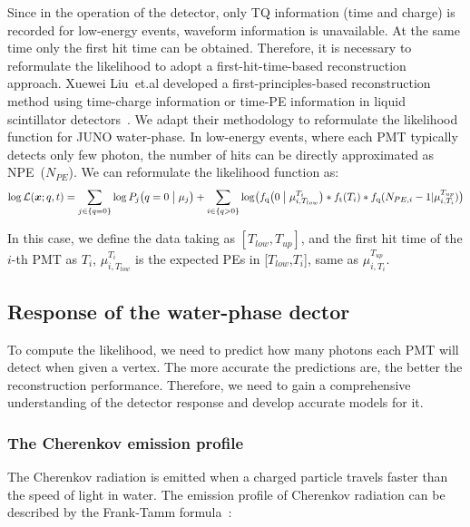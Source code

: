 Since in the operation of the detector, only TQ information (time and charge) is recorded for low-energy events, waveform information is unavailable. At the same time only the first hit time can be obtained. Therefore, it is necessary to reformulate the likelihood to adopt a first-hit-time-based reconstruction approach. Xuewei Liu~et.al developed a first-principles-based reconstruction method using time-charge information or time-PE information in liquid scintillator detectors~\cite{Liu:2024cxo}. We adapt their methodology to reformulate the likelihood function for JUNO water-phase. In low-energy events, where each PMT typically detects only few photon, the number of hits can be directly approximated as NPE~($N_{PE}$). We can reformulate the likelihood function as:
\begin{equation}
	\log \mathcal{L}(\boldsymbol{x};{q},{t})= \sum_{j \in \{q=0\}}\log P_j \bigl( q=0\bigm| \mu_j \bigr)+\sum_{i \in \{q>0\}} \log \bigl( f_{\mathrm{q}}\bigl( 0 \bigm| \mu_{i,T_{low}}^{T_i} \bigr) * f_{\mathrm{t}}(T_i) * f_{\mathrm{q}}(N_{PE,i}-1|\mu_{i,T_{i}}^{T_{up}}) \bigr)
\end{equation}

In this case, we define the data taking as $[T_{low},T_{up}]$, and the first hit time of the $i$-th PMT as $T_{i}$, $\mu_{i,T_{low}}^{T_i}$ is the expected PEs in [$T_{low}$,${T_i}$], same as $\mu_{i,T_{i}}^{T_{up}}$.

\subsection{Response of the water-phase dector}
To compute the likelihood, we need to predict how many photons each PMT will detect  when given a vertex. The more accurate the predictions are, the better the reconstruction performance. Therefore, we need to gain a comprehensive understanding of the detector response and develop accurate models for it.
\subsubsection{The Cherenkov emission profile}
The Cherenkov radiation is emitted when a charged particle travels faster than the speed of light in water. The emission profile of Cherenkov radiation can be described by the Frank-Tamm formula~\cite{LANNUNZIATA2023823}:


